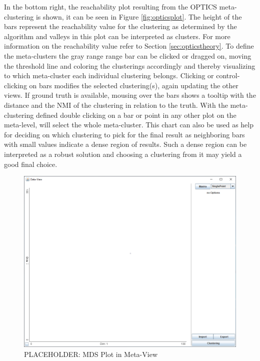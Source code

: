 \documentclass[
	a4paper,
	english,
	twoside,
	openright,               
	11pt                            
	]{report}
\begin{document}
In the bottom right, the reachability plot resulting from the OPTICS meta-clustering is shown, it can be seen in Figure \ref{fig:opticsplot}. The height of the bars represent the reachability value for the clustering as determined by the algorithm and valleys in this plot can be interpreted as clusters. For more information on the reachability value refer to Section \ref{sec:opticstheory}. To define the meta-clusters the gray range range bar can be clicked or dragged on, moving the threshold line and coloring the clusterings accordingly and thereby visualizing to which meta-cluster each individual clustering belongs. Clicking or control-clicking on bars modifies the selected clustering(s), again updating the other views. If ground truth is available, mousing over the bars shows a tooltip with the distance and the NMI of the clustering in relation to the truth. With the meta-clustering defined double clicking on a bar or point in any other plot on the meta-level, will select the whole meta-cluster. This chart can also be used as help for deciding on which clustering to pick for the final result as neighboring bars with small values indicate a dense region of results. Such a dense region can be interpreted as a robust solution and choosing a clustering from it may yield a good final choice.

\begin{figure}[h]
	\centering
	\includegraphics[scale=.45]{data-view}
	\caption{PLACEHOLDER: MDS Plot in Meta-View }
	\label{fig:mdsplot}
\end{figure}
\end{document}
